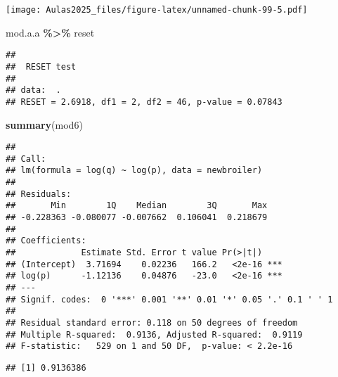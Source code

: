 \documentclass[
]{book}
\newenvironment{Shaded}{\begin{snugshade}}{\end{snugshade}}
\newcommand{\CommentTok}[1]{\textcolor[rgb]{0.56,0.35,0.01}{\textit{#1}}}
\newcommand{\DecValTok}[1]{\textcolor[rgb]{0.00,0.00,0.81}{#1}}
\newcommand{\FunctionTok}[1]{\textcolor[rgb]{0.13,0.29,0.53}{\textbf{#1}}}
\newcommand{\NormalTok}[1]{#1}
\newcommand{\SpecialCharTok}[1]{\textcolor[rgb]{0.81,0.36,0.00}{\textbf{#1}}}
\begin{document}
\texttt{[image: Aulas2025\_files/figure-latex/unnamed-chunk-99-5.pdf]}

\begin{Shaded}
\begin{Highlighting}[]
\NormalTok{mod.a.a }\SpecialCharTok{\%\textgreater{}\%}
\NormalTok{    reset}
\end{Highlighting}
\end{Shaded}

\begin{verbatim}
## 
##  RESET test
## 
## data:  .
## RESET = 2.6918, df1 = 2, df2 = 46, p-value = 0.07843
\end{verbatim}

\begin{Shaded}
\begin{Highlighting}[]
\FunctionTok{summary}\NormalTok{(mod6)}
\end{Highlighting}
\end{Shaded}

\begin{verbatim}
## 
## Call:
## lm(formula = log(q) ~ log(p), data = newbroiler)
## 
## Residuals:
##       Min        1Q    Median        3Q       Max 
## -0.228363 -0.080077 -0.007662  0.106041  0.218679 
## 
## Coefficients:
##             Estimate Std. Error t value Pr(>|t|)    
## (Intercept)  3.71694    0.02236   166.2   <2e-16 ***
## log(p)      -1.12136    0.04876   -23.0   <2e-16 ***
## ---
## Signif. codes:  0 '***' 0.001 '**' 0.01 '*' 0.05 '.' 0.1 ' ' 1
## 
## Residual standard error: 0.118 on 50 degrees of freedom
## Multiple R-squared:  0.9136, Adjusted R-squared:  0.9119 
## F-statistic:   529 on 1 and 50 DF,  p-value: < 2.2e-16
\end{verbatim}

\begin{Shaded}
\end{Shaded}

\begin{verbatim}
## [1] 0.9136386
\end{verbatim}

\backmatter
\end{document}
